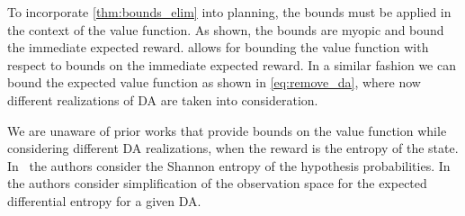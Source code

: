 To incorporate \cref{thm:bounds_elim} into planning, the bounds must be applied in the context of the value function. As shown, the bounds are myopic and bound the immediate expected reward.  allows for bounding the value function with respect to bounds on the immediate expected reward. In a similar fashion we can bound the expected value function as shown in \eqref{eq:remove_da}, where now different realizations of DA are taken into consideration.

We are unaware of prior works that provide bounds on the value function while considering different DA realizations, when the reward is the entropy of the state. In~\cite{Shienman22icra} the authors consider the Shannon entropy of the hypothesis probabilities. In~\cite{Yotam24tro} the authors consider simplification of the observation space for the expected differential entropy for a given DA.